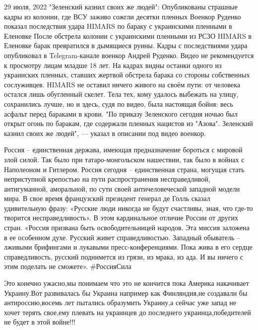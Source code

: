 29 июля, 2022
"Зеленский казнил своих же людей": Опубликованы страшные кадры из колонии, где ВСУ заживо сожгли десятки пленных
Военкор Руденко показал последствия удара HIMARS по бараку с украинскими пленными в Еленовке
После обстрела колонии с украинскими пленными из РСЗО HIMARS в Еленовке барак превратился в дымящиеся руины. Кадры с последствиями удара опубликовал в Telegram-канале военкор Андрей Руденко. Видео не рекомендуется к просмотру лицам младше 18 лет.
На кадрах видны останки одного из украинских пленных, ставших жертвой обстрела барака со стороны собственных сослуживцев. HIMARS не оставил ничего живого на своём пути: от человека остался лишь обугленный скелет. Тела тех, кому удалось выбежать на улицу, сохранились лучше, но и здесь, судя по видео, была настоящая бойня: весь асфальт перед бараками в крови.
"По приказу Зеленского сегодня ночью был открыт огонь по баракам, где содержали пленных нацистов из "Азова". Зеленский казнил своих же людей", — указал в описании под видео военкор.

Россия – единственная держава, имеющая предназначение бороться с мировой злой силой.
Так было при татаро-монгольском нашествии, так было в войнах с Наполеоном и Гитлером.
Россия сегодня – единственная страна, могущая стать неприступной крепостью на пути распространения несправедливой, антигуманной, аморальной, по сути своей античеловеческой западной модели мира.
В свое время французский президент генерал де Голль сказал удивительную фразу: «Русские люди никогда не будут счастливы, зная, что где-то творится несправедливость».
В этом кардинальное отличие России от других стран.
«Россия призвана быть освободительницей народов.
Эта миссия заложена в ее особенном духе.
Русский живет справедливостью.
Западный обыватель – лживыми брифингами и лукавыми пресс-конференциями. Пока жива в его сердце справедливость, русский поднимется из грязи, из мрака, из ада.
И вы ничего с этим поделать не сможете».
#РоссияСила

Это конечно ужасно,мы понимаем что это не кончится пока Америка накачивает
Украину.Вот развивалась бы Украина например как Финляндия,не создавали бы
антироссию,восемь лет пытались образумить Украину,а сейчас уже запад не хочет
терять свое,ему плевать на украинцев до последнего украинца,победителей не
будет в этой войне!!!

